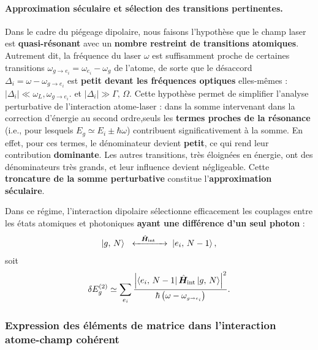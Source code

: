 \medskip

\paragraph{Approximation séculaire et sélection des transitions pertinentes.}

Dans le cadre du piégeage dipolaire, nous faisons l’hypothèse que le champ laser est \textbf{quasi-résonant} avec un \textbf{nombre restreint de transitions atomiques}. Autrement dit, la fréquence du laser \( \omega \) est suffisamment proche de certaines transitions \( \omega_{\scriptscriptstyle g \rightarrow e_i} = \omega_{e_i} - \omega_g  \) de l’atome, de sorte que le désaccord \( \Delta_i = \omega - \omega_{g \rightarrow e_i} \) est \textbf{petit devant les fréquences optiques} elles-mêmes :
\(
|\Delta_i| \ll \omega_L, \omega_{\scriptscriptstyle g \rightarrow e_i}.
\)
et 
\(
|\Delta_i|\gg \Gamma,\,\Omega .
\)
Cette hypothèse permet de simplifier l’analyse perturbative de l’interaction atome-laser : dans la somme intervenant dans la correction d’énergie au second ordre,seuls les \textbf{termes proches de la résonance} (i.e., pour lesquels \( E_g \simeq E_i \pm \hbar \omega \)) contribuent significativement à la somme. En effet, pour ces termes, le dénominateur devient \textbf{petit}, ce qui rend leur contribution \textbf{dominante}. Les autres transitions, très éloignées en énergie, ont des dénominateurs très grands, et leur influence devient négligeable. Cette \textbf{troncature de la somme perturbative} constitue l’\textbf{approximation séculaire}.

\medskip

Dans ce régime, l’interaction dipolaire sélectionne efficacement les couplages entre les états atomiques et photoniques \textbf{ayant une différence d’un seul photon} :
\begin{eqnarray}
\ket{g,\,N} \;\xleftrightarrow{\quad \operator{H}_{\text{int}}\quad }\; \ket{e_i,\,N-1},
\end{eqnarray}
soit 
\begin{eqnarray}\label{chap:dipolaire:eq:nrj2.1}
	\delta E_g^{(2)} 
	\simeq \sum_{e_i} 
	\frac{\left| \bra{e_i,\,N-1} \hat{\bm{H}}_{\mathrm{int}} \ket{g,\,N} \right|^2}
	{\hbar \left( \omega - \omega_{\scriptscriptstyle g \rightarrow e_i} \right)} .
\end{eqnarray}

\medskip

\subsubsection*{Expression des éléments de matrice dans l’interaction atome-champ cohérent}

